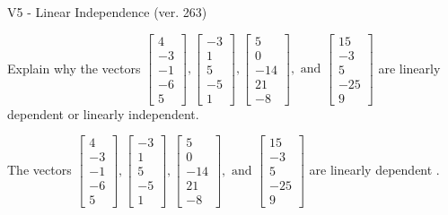 \begin{exercise}
  \begin{exerciseTitle}V5 - Linear Independence (ver. 263)\end{exerciseTitle}
  \begin{exerciseStatement}
    Explain why the vectors \(\left[\begin{array}{r}
4 \\
-3 \\
-1 \\
-6 \\
5
\end{array}\right] , \left[\begin{array}{r}
-3 \\
1 \\
5 \\
-5 \\
1
\end{array}\right] , \left[\begin{array}{r}
5 \\
0 \\
-14 \\
21 \\
-8
\end{array}\right] , \text{ and } \left[\begin{array}{r}
15 \\
-3 \\
5 \\
-25 \\
9
\end{array}\right]\) are linearly dependent or linearly independent.	


  \end{exerciseStatement}
  \begin{exerciseAnswer}
   The vectors \(\left[\begin{array}{r}
4 \\
-3 \\
-1 \\
-6 \\
5
\end{array}\right] , \left[\begin{array}{r}
-3 \\
1 \\
5 \\
-5 \\
1
\end{array}\right] , \left[\begin{array}{r}
5 \\
0 \\
-14 \\
21 \\
-8
\end{array}\right] , \text{ and } \left[\begin{array}{r}
15 \\
-3 \\
5 \\
-25 \\
9
\end{array}\right]\) are 
  	 linearly dependent  .
  


  \end{exerciseAnswer}
\end{exercise}